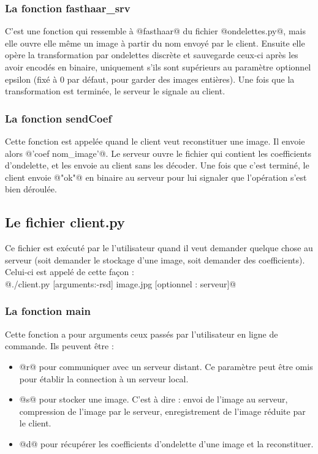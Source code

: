 \documentclass{article}
\begin{document}
\subsubsection{La fonction fasthaar\_srv}

C'est une fonction qui ressemble à @fasthaar@ du fichier @ondelettes.py@, mais elle ouvre elle même un image à partir du nom envoyé par le client. Ensuite elle opère la transformation par ondelettes discrète et sauvegarde ceux-ci après les avoir encodés en binaire, uniquement s'ils sont supérieurs au paramètre optionnel epsilon (fixé à 0 par défaut, pour garder des images entières). Une fois que la transformation est terminée, le serveur le signale au client.

\subsubsection{La fonction sendCoef}

Cette fonction est appelée quand le client veut reconstituer une image. Il envoie alors @'coef nom_image'@. Le serveur ouvre le fichier qui contient les coefficients d'ondelette, et les envoie au client sans les décoder. Une fois que c'est terminé, le client envoie @"ok"@ en binaire au serveur pour lui signaler que l'opération s'est bien déroulée.

\subsection{Le fichier client.py}

Ce fichier est exécuté par le l'utilisateur quand il veut demander quelque chose au serveur (soit demander le stockage d'une image, soit demander des coefficients). Celui-ci est appelé de cette façon : \\ @./client.py [arguments:-rsd] image.jpg [optionnel : serveur]@

\subsubsection{La fonction main}

Cette fonction a pour arguments ceux passés par l'utilisateur en ligne de commande. Ils peuvent être :

\begin{itemize}
\item @r@ pour communiquer avec un serveur distant. Ce paramètre peut être omis pour établir la connection à un serveur local.

\item @s@ pour stocker une image. C'est à dire : envoi de l'image au serveur, compression de l'image par le serveur, enregistrement de l'image réduite par le client.

\item @d@ pour récupérer les coefficients d'ondelette d'une image et la reconstituer.

\end{itemize}
\end{document}
